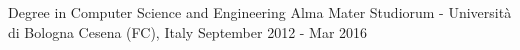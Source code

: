 

\begin{cventries}

  \cventry
    {Degree in Computer Science and Engineering} %
    {Alma Mater Studiorum - Università di Bologna} %
    {Cesena (FC), Italy} %
    {September 2012 - Mar 2016} %
    {}
    

\end{cventries}
